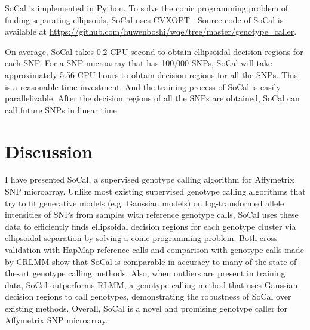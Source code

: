 \documentclass{scrartcl}
\begin{document}
\par
SoCal is implemented in Python.
To solve the conic programming problem of finding separating ellipsoids,
SoCal uses CVXOPT \cite{andersen2014}.
Source code of SoCal is available at
\url{https://github.com/huwenboshi/wqe/tree/master/genotype_caller}.

\par
On average, SoCal takes 0.2 CPU second to obtain ellipsoidal decision
regions for each SNP.
For a SNP microarray that has 100,000 SNPs, SoCal will take approximately
5.56 CPU hours to obtain decision regions for all the SNPs.
This is a reasonable time investment.
And the training process of SoCal is easily parallelizable.
After the decision regions of all the SNPs are obtained, SoCal can call
future SNPs in linear time.






\section{Discussion}

\par
I have presented SoCal, a supervised genotype calling algorithm for Affymetrix
SNP microarray.
Unlike most existing supervised genotype calling algorithms that try to fit
generative models (e.g. Gaussian models) on log-transformed allele
intensities of SNPs from samples with reference genotype calls,
SoCal uses these data to efficiently finds ellipsoidal decision regions for
each genotype cluster via ellipsoidal separation by solving a conic
programming problem.
Both cross-validation with HapMap reference calls and comparison with
genotype calls made by CRLMM show that SoCal is comparable in accuracy to many
of the state-of-the-art genotype calling methods.
Also, when outliers are present in training data, SoCal outperforms RLMM, a
genotype calling method that uses Gaussian decision regions to call genotypes,
demonstrating the robustness of SoCal over existing methods.
Overall, SoCal is a novel and promising genotype caller for
Affymetrix SNP microarray.
\end{document}
